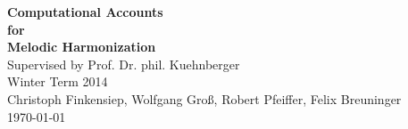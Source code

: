 \begin{titlepage}
		\centering
		\textbf{\Huge Computational Accounts\\\vspace{2 mm} for\\\vspace{5 mm} Melodic Harmonization}\\
		\vspace{15 mm}Supervised by Prof. Dr. phil. Kuehnberger\\ 
		\vspace{5 mm}Winter Term 2014\\
		\vspace{\fill}
		\raggedleft Christoph Finkensiep, Wolfgang Gro\ss, Robert Pfeiffer, Felix Breuninger\\
		\vspace{5 mm}\today
\end{titlepage}